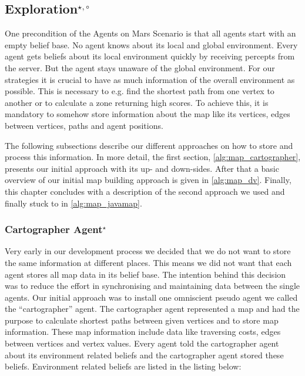 \subsection[Exploration]{Exploration$^{\star,\circ}$}\label{alg:exploration} %
One precondition of the Agents on Mars Scenario is that all agents start with an empty belief base.
No agent knows about its local and global environment.
Every agent gets beliefs about its local environment quickly by receiving percepts from the server. %
But the agent stays unaware of the global environment.
For our strategies it is crucial to have as much information of the overall environment as possible.
This is necessary to e.g. find the shortest path from one vertex to another or to calculate a zone returning high scores.
To achieve this, it is mandatory to somehow store information about the map like its vertices, edges between vertices, paths and agent positions.

The following subsections describe our different approaches on how to store and process this information.
In more detail, the first section, \autoref{alg:map_cartographer}, presents our initial approach with its up- and down-sides.
After that a basic overview of our initial map building approach is given in \autoref{alg:map_dv}.
Finally, this chapter concludes with a description of the second approach we used and finally stuck to in \autoref{alg:map_javamap}. %

\subsubsection[Cartographer Agent]{Cartographer Agent$^\star$}\label{alg:map_cartographer}
Very early in our development process we decided that we do not want to store the same information at different places.
This means we did not want that each agent stores all map data in its belief base.
The intention behind this decision was to reduce the effort in synchronising and maintaining data between the single agents.
Our initial approach was to install one omniscient pseudo agent we called the ``cartographer'' agent.
The cartographer agent represented a map and had the purpose to calculate shortest paths between given vertices and to store map information.
These map information include data like traversing costs, edges between vertices and vertex values.
Every agent told the cartographer agent about its environment related beliefs and the cartographer agent stored these beliefs.
Environment related beliefs are listed in the listing below:

